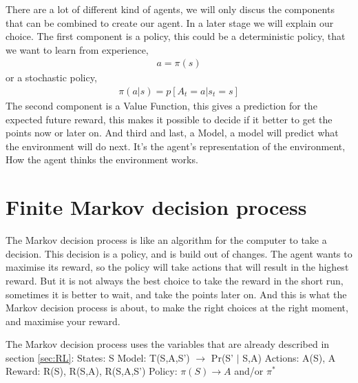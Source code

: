 \documentclass{report}
\begin{document}
There are a lot of different kind of agents, we will only discus the components that can be combined to create our agent. In a later stage we will explain our choice. The first component is a policy, this could be a deterministic policy, that we want to learn from experience,
\begin{align}
    a=\pi(s)    
\end{align}
or a stochastic policy,
\begin{align}
    \pi(a|s)=p[A_t=a|s_t=s]
\end{align}
The second component is a Value Function, this gives a prediction for the expected future reward, this makes it possible to decide if it better to get the points now or later on.
And third and last, a Model, a model will predict what the environment will do next. It’s the agent’s representation of the environment, How the agent thinks the environment works.

\section{Finite Markov decision process \label{sec:MDP}}
The Markov decision process is like an algorithm for the computer to take a decision. This decision is a policy, and is build out of changes. The agent wants to maximise its reward, so the policy will take actions that will result in the highest reward. But it is not always the best choice to take the reward in the short run, sometimes it is better to wait, and take the points later on. And this is what the Markov decision process is about, to make the right choices at the right moment, and maximise your reward.

The Markov decision process uses the variables that are already described in section \ref{sec:RL}:\newline
States: S\newline
Model: T(S,A,S') $\rightarrow$ Pr(S' $\mid$ S,A)\newline
Actions: A(S), A\newline
Reward: R(S), R(S,A), R(S,A,S')\newline
Policy: $\pi(S) \rightarrow A$ and/or $\pi^*$\newline
\end{document}
